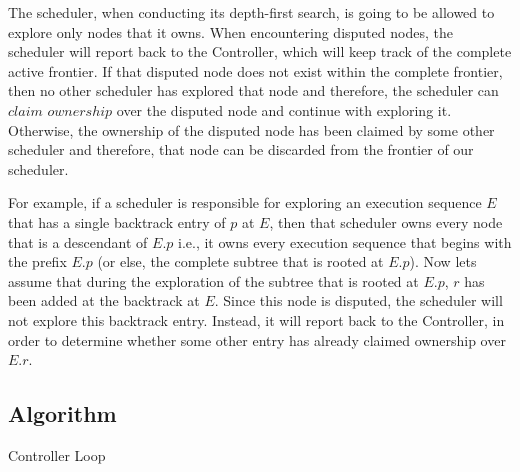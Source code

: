 The scheduler, when conducting its depth-first search, is going to be
allowed to explore only nodes that it owns. When encountering disputed
nodes, the scheduler will report back to the Controller, which will 
keep track of the complete active frontier. If that disputed node
does not exist within the complete frontier, then no other 
scheduler has explored that node and therefore, the scheduler
can $claim$ $ownership$ over the disputed node and continue with 
exploring it. Otherwise, the ownership of the disputed node
has been claimed by some other scheduler and therefore, that node
can be discarded from the frontier of our scheduler.

For example, if a scheduler is responsible
for exploring an execution sequence $E$ that has a single backtrack 
entry of $p$ at $E$, then that scheduler owns every node
that is a descendant of $E.p$ i.e., it owns every execution sequence
that begins with the prefix $E.p$ (or else, the complete subtree that is rooted at $E.p$). Now lets assume that during the exploration of the subtree that is rooted at $E.p$, $r$ has been added at
the backtrack at $E$. Since this node is disputed, the scheduler
will not explore this backtrack entry. Instead, it will report
back to the Controller, in order to determine whether some other entry
has already claimed ownership over $E.r$. 


\subsection{Algorithm}

\begin{algorithm}
    \caption{Controller Loop}
    \label{controllerloop}

\end{algorithm}

